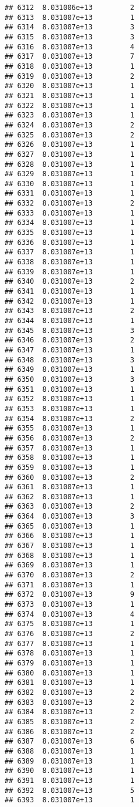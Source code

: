 \documentclass[
]{article}
\begin{document}
\begin{verbatim}
## 6312  8.031006e+13         2
## 6313  8.031007e+13         1
## 6314  8.031007e+13         3
## 6315  8.031007e+13         3
## 6316  8.031007e+13         4
## 6317  8.031007e+13         7
## 6318  8.031007e+13         1
## 6319  8.031007e+13         2
## 6320  8.031007e+13         1
## 6321  8.031007e+13         1
## 6322  8.031007e+13         1
## 6323  8.031007e+13         1
## 6324  8.031007e+13         2
## 6325  8.031007e+13         2
## 6326  8.031007e+13         1
## 6327  8.031007e+13         1
## 6328  8.031007e+13         1
## 6329  8.031007e+13         1
## 6330  8.031007e+13         1
## 6331  8.031007e+13         1
## 6332  8.031007e+13         2
## 6333  8.031007e+13         1
## 6334  8.031007e+13         1
## 6335  8.031007e+13         1
## 6336  8.031007e+13         1
## 6337  8.031007e+13         1
## 6338  8.031007e+13         1
## 6339  8.031007e+13         1
## 6340  8.031007e+13         2
## 6341  8.031007e+13         1
## 6342  8.031007e+13         1
## 6343  8.031007e+13         2
## 6344  8.031007e+13         1
## 6345  8.031007e+13         3
## 6346  8.031007e+13         2
## 6347  8.031007e+13         1
## 6348  8.031007e+13         3
## 6349  8.031007e+13         1
## 6350  8.031007e+13         3
## 6351  8.031007e+13         1
## 6352  8.031007e+13         1
## 6353  8.031007e+13         1
## 6354  8.031007e+13         2
## 6355  8.031007e+13         1
## 6356  8.031007e+13         2
## 6357  8.031007e+13         1
## 6358  8.031007e+13         1
## 6359  8.031007e+13         1
## 6360  8.031007e+13         2
## 6361  8.031007e+13         1
## 6362  8.031007e+13         1
## 6363  8.031007e+13         2
## 6364  8.031007e+13         3
## 6365  8.031007e+13         1
## 6366  8.031007e+13         1
## 6367  8.031007e+13         1
## 6368  8.031007e+13         1
## 6369  8.031007e+13         1
## 6370  8.031007e+13         2
## 6371  8.031007e+13         1
## 6372  8.031007e+13         9
## 6373  8.031007e+13         1
## 6374  8.031007e+13         4
## 6375  8.031007e+13         1
## 6376  8.031007e+13         2
## 6377  8.031007e+13         1
## 6378  8.031007e+13         1
## 6379  8.031007e+13         1
## 6380  8.031007e+13         1
## 6381  8.031007e+13         1
## 6382  8.031007e+13         2
## 6383  8.031007e+13         2
## 6384  8.031007e+13         2
## 6385  8.031007e+13         2
## 6386  8.031007e+13         2
## 6387  8.031007e+13         6
## 6388  8.031007e+13         1
## 6389  8.031007e+13         1
## 6390  8.031007e+13         1
## 6391  8.031007e+13         1
## 6392  8.031007e+13         5
## 6393  8.031007e+13         1

\end{verbatim}
\end{document}
